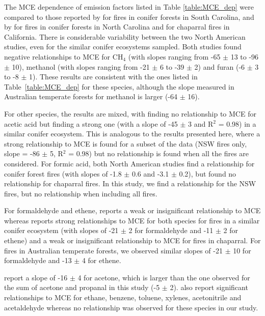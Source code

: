 \documentclass[acp, manuscript]{copernicus}
\begin{document}
The MCE dependence of emission factors listed in Table \ref{table:MCE_dep} were compared to those reported by \citet{Akagi2013} for fires in conifer forests in South Carolina, and by \citet{Burling2011} for fires in conifer forests in North Carolina and for chaparral fires in California. There is considerable variability between the two North American studies, even for the similar conifer ecosystems sampled. 
Both studies found negative relationships to MCE for CH$_4$ (with slopes ranging from -65 $\pm$ 13 to -96 $\pm$ 10), methanol (with slopes ranging from -21 $\pm$ 6 to -39 $\pm$ 2) and furan (-6 $\pm$ 3 to -8 $\pm$ 1). These results are consistent with the ones listed in Table~\ref{table:MCE_dep} for these species, although the slope measured in Australian temperate forests for methanol is larger (-64 $\pm$ 16). 

For other species, the results are mixed, with \citet{Akagi2013} finding no relationship to MCE for acetic acid but \citet{Burling2011} finding a strong one (with a slope of -45 $\pm$ 3 and R$^2$ = 0.98) in a similar conifer ecosystem. This is analogous to the results presented here, where a strong relationship to MCE is found for a subset of the data (NSW fires only, slope = -86 $\pm$ 5, R$^2$ = 0.98) but no relationship is found when all the fires are considered. 
For formic acid, both North American studies find a relationship for conifer forest fires (with slopes of -1.8 $\pm$ 0.6 and -3.1 $\pm$ 0.2), but \citet{Burling2011} found no relationship for chaparral fires. In this study, we find a relationship for the NSW fires, but no relationship when including all fires. 

For formaldehyde and ethene, \citet{Akagi2013} reports a weak or insignificant relationship to MCE whereas \citet{Burling2011} reports strong relationships to MCE for both species for fires in a similar conifer ecosystem (with slopes of -21 $\pm$ 2 for formaldehyde and -11 $\pm$ 2 for ethene) and a weak or insignificant relationship to MCE for fires in chaparral. For fires in Australian temperate forests, we observed similar slopes of -21 $\pm$ 10 for formaldehyde and -13 $\pm$ 4 for ethene. 

\citet{Akagi2013} report a slope of -16 $\pm$ 4 for acetone, which is larger than the one observed for the sum of acetone and propanal in this study (-5 $\pm$ 2). \citet{Akagi2013} also report significant relationships to MCE for ethane, benzene, toluene, xylenes, acetonitrile and acetaldehyde whereas no relationship was observed for these species in our study.
\end{document}
